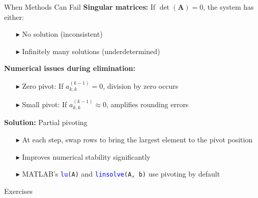 \documentclass[aspectratio=169]{beamer}
\begin{document}
\begin{frame}{When Methods Can Fail}
	\textbf{Singular matrices:} If $\det(\mathbf{A}) = 0$, the system has either:
	\begin{itemize}
		\item[$\blacktriangleright$]
		      No solution (inconsistent)
		\item[$\blacktriangleright$]
		      Infinitely many solutions (underdetermined)
	\end{itemize}

	\vspace{0.3cm}
	\textbf{Numerical issues during elimination:}
	\begin{itemize}
		\item[$\blacktriangleright$]
		      \alert{Zero pivot:} If $a_{k,k}^{(k-1)} = 0$, division by zero occurs

		\item[$\blacktriangleright$]
		      \alert{Small pivot:} If $a_{k,k}^{(k-1)} \approx 0$, amplifies rounding errors
	\end{itemize}

	\vspace{0.3cm}
	\textbf{Solution:} \alert{Partial pivoting}
	\begin{itemize}
		\item[$\blacktriangleright$]
		      At each step, swap rows to bring the largest element to the pivot position
		\item[$\blacktriangleright$]
		      Improves numerical stability significantly
		\item[$\blacktriangleright$]
		      MATLAB's \texttt{\textcolor{blue}{lu}(A)} and \texttt{\textcolor{blue}{linsolve}(A, b)} use pivoting by default
	\end{itemize}
\end{frame}

{%
\begin{frame}[standout]
	Exercises
\end{frame}
}
\end{document}
